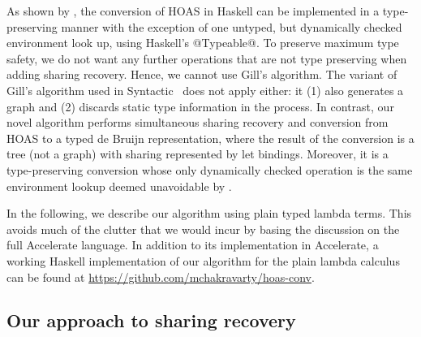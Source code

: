 As shown by \citet{Atkey:Unembedding}, the conversion of HOAS in Haskell can be implemented in a type-preserving manner with the exception of one untyped, but dynamically checked environment look up, using Haskell's @Typeable@. To preserve maximum type safety, we do not want any further operations that are not type preserving when adding sharing recovery. Hence, we cannot use Gill's algorithm. The variant of Gill's algorithm used in Syntactic~\cite{Axelsson:Syntactic} does not apply either: it (1) also generates a graph and (2) discards static type information in the process. In contrast, our novel algorithm performs simultaneous sharing recovery and conversion from HOAS to a typed de Bruijn representation, where the result of the conversion is a tree (not a graph) with sharing represented by let bindings. Moreover, it is a type-preserving conversion whose only dynamically checked operation is the same environment lookup deemed unavoidable by \citet{Atkey:Unembedding}.

In the following, we describe our algorithm using plain typed lambda terms. This avoids much of the clutter that we would incur by basing the discussion on the full Accelerate language. In addition to its implementation in Accelerate, a working Haskell implementation of our algorithm for the plain lambda calculus can be found at \url{https://github.com/mchakravarty/hoas-conv}.


\subsection{Our approach to sharing recovery}

